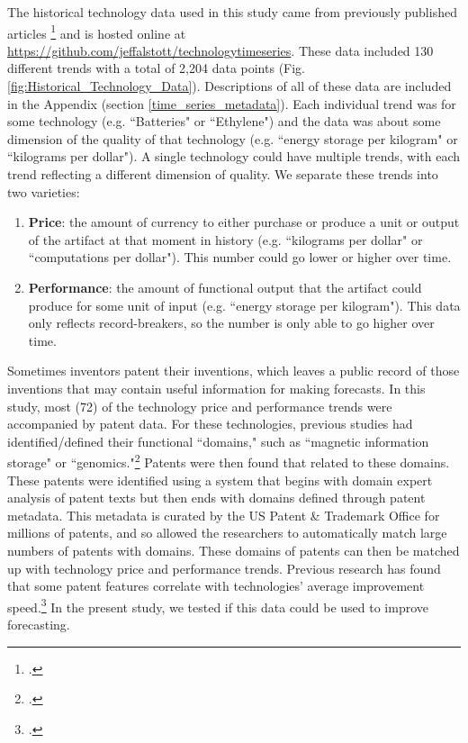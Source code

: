 \documentclass{article}
\begin{document}
The historical technology data used in this study came from previously published articles \footcite{Farmer2016,Magee2016a,Nagy2013} and is hosted online at \url{https://github.com/jeffalstott/technologytimeseries}. These data included 130 different trends with a total of 2,204 data points (Fig. \ref{fig:Historical_Technology_Data}). Descriptions of all of these data are included in the Appendix (section \ref{time_series_metadata}). Each individual trend was for some technology (e.g. ``Batteries" or ``Ethylene") and the data was about some dimension of the quality of that technology (e.g. ``energy storage per kilogram" or ``kilograms per dollar"). A single technology could have multiple trends, with each trend reflecting a different dimension of quality. We separate these trends into two varieties:
\begin{enumerate}
    \item \textbf{Price}: the amount of currency to either purchase or produce a unit or output of the artifact at that moment in history (e.g. ``kilograms per dollar" or ``computations per dollar"). This number could go lower or higher over time. 
    \item \textbf{Performance}: the amount of functional output that the artifact could produce for some unit of input (e.g. ``energy storage per kilogram"). This data only reflects record-breakers, so the number is only able to go higher over time.
\end{enumerate}

Sometimes inventors patent their inventions, which leaves a public record of those inventions that may contain useful information for making forecasts. In this study, most (72) of the technology price and performance trends were accompanied by patent data. For these technologies, previous studies had identified/defined their functional ``domains," such as ``magnetic information storage" or ``genomics."\footcite{Benson2012,Benson2014} Patents were then found that related to these domains. These patents were identified using a system that begins with domain expert analysis of patent texts but then ends with domains defined through patent metadata. This metadata is curated by the US Patent \& Trademark Office for millions of patents, and so allowed the researchers to automatically match large numbers of patents with domains. These domains of patents can then be matched up with technology price and performance trends. Previous research has found that some patent features correlate with technologies' average improvement speed.\footcite{Benson2015,Triulzi2017} In the present study, we tested if this data could be used to improve forecasting. 
\end{document}
